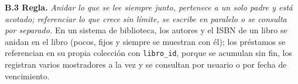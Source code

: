 \documentclass[10pt,letterpaper]{article}
\begin{document}
\textbf{B.3 Regla.} \emph{Anidar lo que se lee siempre junto, pertenece a un solo padre y está
acotado; referenciar lo que crece sin límite, se escribe en paralelo o se consulta por separado.}
En un sistema de biblioteca, los autores y el ISBN de un libro se anidan en el libro (pocos, fijos y
siempre se muestran con él); los préstamos se referencian en su propia colección con
\texttt{libro\_id}, porque se acumulan sin fin, los registran varios mostradores a la vez y se
consultan por usuario o por fecha de vencimiento.
\end{document}
